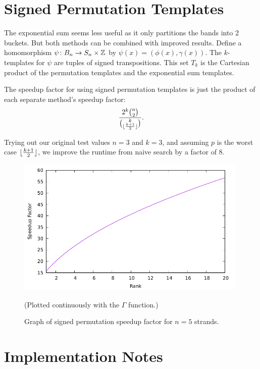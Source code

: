\documentclass[12pt]{thesis}
\begin{document}
\section{Signed Permutation Templates}

The exponential sum seems less useful as it only
partitions the bands into $2$ buckets.
But both methods can be combined with improved results.
Define a homomorphism $\psi \colon B_{n} \rightarrow S_{n} \times \mathbb{Z}$
by $\psi(x) = (\phi(x), \gamma(x))$.
The $k$-templates for $\psi$ are tuples
of signed transpositions.
This set $T_{k}$ is the Cartesian product of the permutation
templates and the exponential sum templates.

\begin{proposition}
The speedup factor for using signed permutation templates is just the product of each
separate method's speedup factor:
\[
    \frac{2^{k} {n \choose 2}}{ { k \choose \lfloor \frac{k + 1}{2} \rfloor}}.
\]
\end{proposition}

Trying out our original test values $n = 3$ and $k = 3$,
and assuming $p$ is the worst case $\lfloor \frac{k + 1}{2} \rfloor$, we improve
the runtime from naive search by a factor of $8$.

\begin{figure}[h]
    \centering
    \includegraphics[width=11cm]{combined-speedup.pdf}

    \caption{Graph of signed permutation speedup factor for $n = 5$ strands.}
    \label{fig:combined-speedup}

    (Plotted continuously with the $\Gamma$ function.)
\end{figure}

\section{Implementation Notes}
\end{document}
